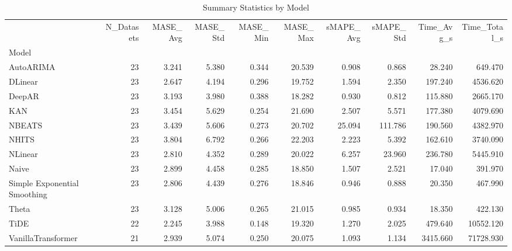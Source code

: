 \begin{table}
\caption{Summary Statistics by Model}
\label{tab:model_summary}
\begin{tabular}{lrrrrrrrrr}
\toprule
 & N_Datasets & MASE_Avg & MASE_Std & MASE_Min & MASE_Max & sMAPE_Avg & sMAPE_Std & Time_Avg_s & Time_Total_s \\
Model &  &  &  &  &  &  &  &  &  \\
\midrule
AutoARIMA & 23 & 3.241 & 5.380 & 0.344 & 20.539 & 0.908 & 0.868 & 28.240 & 649.470 \\
DLinear & 23 & 2.647 & 4.194 & 0.296 & 19.752 & 1.594 & 2.350 & 197.240 & 4536.620 \\
DeepAR & 23 & 3.193 & 3.980 & 0.388 & 18.282 & 0.930 & 0.812 & 115.880 & 2665.170 \\
KAN & 23 & 3.454 & 5.629 & 0.254 & 21.690 & 2.507 & 5.571 & 177.380 & 4079.690 \\
NBEATS & 23 & 3.439 & 5.606 & 0.273 & 20.702 & 25.094 & 111.786 & 190.560 & 4382.970 \\
NHITS & 23 & 3.804 & 6.792 & 0.266 & 22.203 & 2.223 & 5.392 & 162.610 & 3740.090 \\
NLinear & 23 & 2.810 & 4.352 & 0.289 & 20.022 & 6.257 & 23.960 & 236.780 & 5445.910 \\
Naive & 23 & 2.899 & 4.458 & 0.285 & 18.850 & 1.507 & 2.521 & 17.040 & 391.970 \\
Simple Exponential Smoothing & 23 & 2.806 & 4.439 & 0.276 & 18.846 & 0.946 & 0.888 & 20.350 & 467.990 \\
Theta & 23 & 3.128 & 5.006 & 0.265 & 21.015 & 0.985 & 0.934 & 18.350 & 422.130 \\
TiDE & 22 & 2.245 & 3.988 & 0.148 & 19.320 & 1.270 & 2.025 & 479.640 & 10552.120 \\
VanillaTransformer & 21 & 2.939 & 5.074 & 0.250 & 20.075 & 1.093 & 1.134 & 3415.660 & 71728.930 \\
\bottomrule
\end{tabular}
\end{table}
